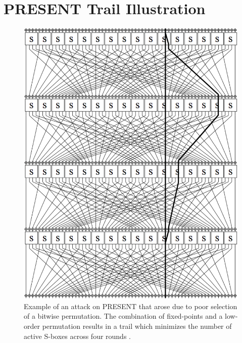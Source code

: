 \chapter{PRESENT Trail Illustration}
\label{appx:PRESENT_Trail}
\begin{figure}[ht]
\centering
\includegraphics[height=0.62\textheight]{img/PRESENT_Trail.png}
\caption{
Example of an attack on PRESENT that arose due to poor selection of a bitwise permutation. The combination of fixed-points and a low-order permutation results in a trail which minimizes the number of active S-boxes across four rounds \cite{Nakahara2009_PRESENT_Cryptanalysis}.
}
\label{fig:PRESENT_Trail}
\end{figure}

